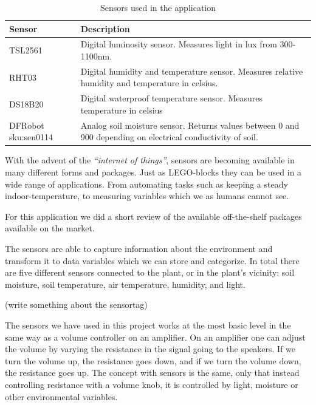\def\arraystretch{1.8}
\begin{table}
    \begin{tabular}{|l|p{250pt}|}
    \hline
    \textbf{Sensor}               & \textbf{Description}                                                                                                  \\ \hline
    TSL2561              & Digital luminosity sensor. Measures light in lux from 300-1100nm.                                            \\ \hline
    RHT03                & Digital humidity and temperature sensor. Measures relative humidity and temperature in celsius.              \\ \hline
    DS18B20              & Digital waterproof temperature sensor. Measures temperature in celsius                                       \\ \hline
    DFRobot sku:sen0114  & Analog soil moisture sensor. Returns values between 0 and 900 depending on electrical conductivity of soil.  \\ \hline
    \end{tabular}
    \caption{Sensors used in the application}
\end{table}


With the advent of the \emph{“internet of things”}, sensors are becoming available in many different forms and packages. Just as LEGO-blocks they can be used in a wide range of applications. From automating tasks such as keeping a steady indoor-temperature, to measuring variables which we as humans cannot see. 

For this application we did a short review of the available off-the-shelf packages available on the market. 

The sensors are able to capture information about the environment and transform it to data variables which we can store and categorize. In total there are five different sensors connected to the plant, or in the plant’s vicinity: soil moisture, soil temperature, air temperature, humidity, and light. 


(write something about the sensortag)

The sensors we have used in this project works at the most basic level in the same way as a volume controller on an amplifier. On an amplifier one can adjust the volume by varying the resistance in the signal going to the speakers. If we turn the volume up, the resistance goes down, and if we turn the volume down, the resistance goes up. The concept with sensors is the same, only that instead controlling resistance with a volume knob, it is controlled by light, moisture or other environmental variables. 

